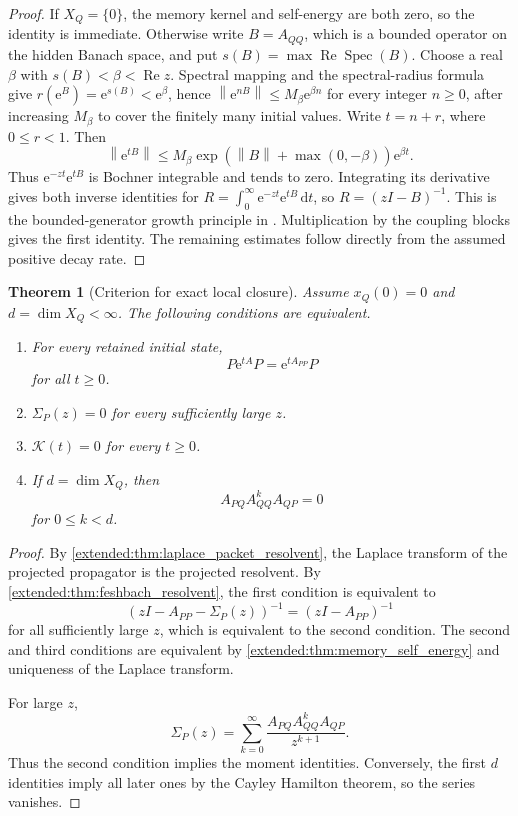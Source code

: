 \documentclass[11pt,letterpaper]{article}
\newtheorem{theorem}{Theorem}[section]
\theoremstyle{plain}
\theoremstyle{plain}
\theoremstyle{plain}
\theoremstyle{definition}
\theoremstyle{definition}
\theoremstyle{definition}
\theoremstyle{definition}
\theoremstyle{definition}
\theoremstyle{remark}
\theoremstyle{remark}
\theoremstyle{remark}
\theoremstyle{remark}
\theoremstyle{remark}
\newcommand{\Spec}{\operatorname{Spec}}
\newcommand{\norm}[1]{\left\lVert#1\right\rVert}
\theoremstyle{remark}
\newcommand{\Kcal}{\mathcal K}
\newcommand{\e}{\mathrm e}
\newcommand{\dd}{\,\mathrm d}
\let\KomorebiPrimitiveMathcal\mathcal
\renewcommand{\mathcal}[1]{{\KomorebiPrimitiveMathcal{#1}}}
\let\KomorebiPrimitivemathrm\mathrm
\renewcommand{\mathrm}[1]{{\KomorebiPrimitivemathrm{#1}}}
\begin{document}
\begin{proof}
If \(X_Q=\{0\}\), the memory kernel and self-energy are both zero, so the identity is immediate. Otherwise write \(B=A_{QQ}\), which is a bounded operator on the hidden Banach space, and put \(s(B)=\max\operatorname{Re}\Spec(B)\). Choose a real \(\beta\) with \(s(B)<\beta<\operatorname{Re}z\). Spectral mapping and the spectral-radius formula give \(r(\e^B)=\e^{s(B)}<\e^\beta\), hence \(\norm{\e^{nB}}\leq M_\beta\e^{\beta n}\) for every integer \(n\geq0\), after increasing \(M_\beta\) to cover the finitely many initial values. Write \(t=n+r\), where \(0\leq r<1\). Then
\[
\norm{\e^{tB}}\leq M_\beta\exp(\norm B+\max(0,-\beta))\e^{\beta t}.
\]
Thus \(\e^{-zt}\e^{tB}\) is Bochner integrable and tends to zero. Integrating its derivative gives both inverse identities for \(R=\int_0^\infty\e^{-zt}\e^{tB}\dd t\), so \(R=(zI-B)^{-1}\). This is the bounded-generator growth principle in \cite[Chapter IV, Corollary 3.12]{EngelNagel2000}. Multiplication by the coupling blocks gives the first identity. The remaining estimates follow directly from the assumed positive decay rate.
\end{proof}

\begin{theorem}[Criterion for exact local closure]\label{extended:record:087}\label{extended:thm:local_closure}
Assume \(x_Q(0)=0\) and \(d=\dim X_Q<\infty\). The following conditions are equivalent.
\begin{enumerate}
\item For every retained initial state,
\[
P\e^{tA}P
=
\e^{tA_{PP}}P
\]
for all \(t\geq0\).
\item \(\Sigma_P(z)=0\) for every sufficiently large \(z\).
\item \(\Kcal(t)=0\) for every \(t\geq0\).
\item If \(d=\dim X_Q\), then
\[
A_{PQ}A_{QQ}^kA_{QP}=0
\]
for \(0\leq k<d\).
\end{enumerate}
\end{theorem}

\begin{proof}
By \cref{extended:thm:laplace_packet_resolvent}, the Laplace transform of the projected propagator is the projected resolvent. By \cref{extended:thm:feshbach_resolvent}, the first condition is equivalent to
\[
(zI-A_{PP}-\Sigma_P(z))^{-1}
=
(zI-A_{PP})^{-1}
\]
for all sufficiently large \(z\), which is equivalent to the second condition. The second and third conditions are equivalent by \cref{extended:thm:memory_self_energy} and uniqueness of the Laplace transform.

For large \(z\),
\[
\Sigma_P(z)
=
\sum_{k=0}^{\infty}
\frac{A_{PQ}A_{QQ}^kA_{QP}}{z^{k+1}}.
\]
Thus the second condition implies the moment identities. Conversely, the first \(d\) identities imply all later ones by the Cayley Hamilton theorem, so the series vanishes.
\end{proof}
\end{document}
